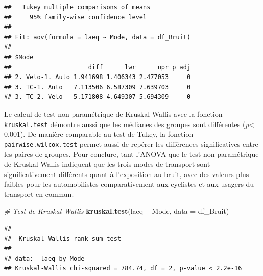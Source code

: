 \documentclass[
  11pt,
  french,
]{book}
\makeatletter
\newenvironment{Shaded}{\begin{snugshade}}{\end{snugshade}}
\newcommand{\CommentTok}[1]{\textcolor[rgb]{0.56,0.35,0.01}{\textit{#1}}}
\newcommand{\DataTypeTok}[1]{\textcolor[rgb]{0.13,0.29,0.53}{#1}}
\newcommand{\KeywordTok}[1]{\textcolor[rgb]{0.13,0.29,0.53}{\textbf{#1}}}
\newcommand{\NormalTok}[1]{#1}
\newcommand{\OperatorTok}[1]{\textcolor[rgb]{0.81,0.36,0.00}{\textbf{#1}}}
\newcommand{\StringTok}[1]{\textcolor[rgb]{0.31,0.60,0.02}{#1}}
\newenvironment{kframe}{%
\medskip{}
\setlength{\fboxsep}{.8em}
 \def\at@end@of@kframe{}%
 \ifinner\ifhmode%
  \def\at@end@of@kframe{\end{minipage}}%
  \begin{minipage}{\columnwidth}%
 \fi\fi%
 \def\FrameCommand##1{\hskip\@totalleftmargin \hskip-\fboxsep
 \colorbox{shadecolor}{##1}\hskip-\fboxsep
     \hskip-\linewidth \hskip-\@totalleftmargin \hskip\columnwidth}%
 \MakeFramed {\advance\hsize-\width
   \@totalleftmargin\z@ \linewidth\hsize
   \@setminipage}}%
 {\par\unskip\endMakeFramed%
 \at@end@of@kframe}
\renewenvironment{Shaded}{\begin{kframe}}{\end{kframe}}
\makeatother
\begin{document}
\begin{verbatim}
##   Tukey multiple comparisons of means
##     95% family-wise confidence level
## 
## Fit: aov(formula = laeq ~ Mode, data = df_Bruit)
## 
## $Mode
##                     diff      lwr      upr p adj
## 2. Velo-1. Auto 1.941698 1.406343 2.477053     0
## 3. TC-1. Auto   7.113506 6.587309 7.639703     0
## 3. TC-2. Velo   5.171808 4.649307 5.694309     0
\end{verbatim}

Le calcul de test non paramétrique de Kruskal-Wallis avec la fonction \texttt{kruskal.test} démontre aussi que les médianes des groupes sont différentes (\emph{p}\textless{} 0,001). De manière comparable au test de Tukey, la fonction \texttt{pairwise.wilcox.test} permet aussi de repérer les différences significatives entre les paires de groupes. Pour conclure, tant l'ANOVA que le test non paramétrique de Kruskal-Wallis indiquent que les trois modes de transport sont significativement différents quant à l'exposition au bruit, avec des valeurs plus faibles pour les automobilistes comparativement aux cyclistes et aux usagers du transport en commun.

\begin{Shaded}
\begin{Highlighting}[]
\CommentTok{# Test de Kruskal-Wallis}
\KeywordTok{kruskal.test}\NormalTok{(laeq }\OperatorTok{~}\StringTok{ }\NormalTok{Mode, }\DataTypeTok{data =}\NormalTok{ df_Bruit)}
\end{Highlighting}
\end{Shaded}

\begin{verbatim}
## 
## 	Kruskal-Wallis rank sum test
## 
## data:  laeq by Mode
## Kruskal-Wallis chi-squared = 784.74, df = 2, p-value < 2.2e-16
\end{verbatim}

\begin{Shaded}
\end{Shaded}
\end{document}

